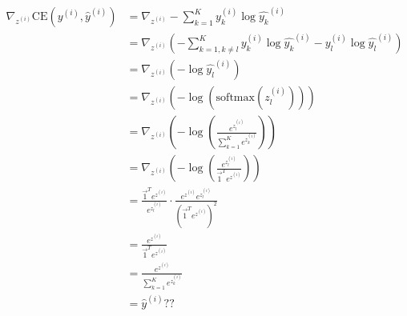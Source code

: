 \begin{answer}
\begin{align*}
\nabla_{z^{(i)}} \mathrm{CE}(y^{(i)}, \hat{y}^{(i)})&=\nabla_{z^{(i)}}- \sum_{k=1}^K y_k^{(i)} \log \hat{y_k}^{(i)}\\
&=\nabla_{z^{(i)}}\left(- \sum_{k=1,k\neq l}^K y_k^{(i)} \log \hat{y_k}^{(i)}-y_l^{(i)} \log \hat{y_l}^{(i)}\right)\\
&=\nabla_{z^{(i)}}\left(-\log \hat{y_l}^{(i)}\right)\\
&=\nabla_{z^{(i)}}\left(-\log(\mathrm{softmax}(z_l^{(i)}))\right)\\
&=\nabla_{z^{(i)}}\left(-\log\left(\frac{e^{z_l^{(i)}}}{\sum_{k=1}^{K}e^{z_k^{(i)}}}\right)\right)\\
&=\nabla_{z^{(i)}}\left(-\log\left(\frac{e^{z_l^{(i)}}}{\vec{1}^Te^{z^{(i)}}}\right)\right)\\
&=\frac{\vec{1}^Te^{z^{(i)}}}{e^{z_l^{(i)}}}\cdot\frac{e^{z^{(i)}}e^{z_l^{(i)}}}{(\vec{1}^Te^{z^{(i)}})^2}\\
&=\frac{e^{z^{(i)}}}{\vec{1}^Te^{z^{(i)}}}\\
&=\frac{e^{z^{(i)}}}{\sum_{k=1}^{K}e^{z_k^{(i)}}}\\
&=\hat{y}^{(i)}??
\end{align*}
\end{answer}
   
  
